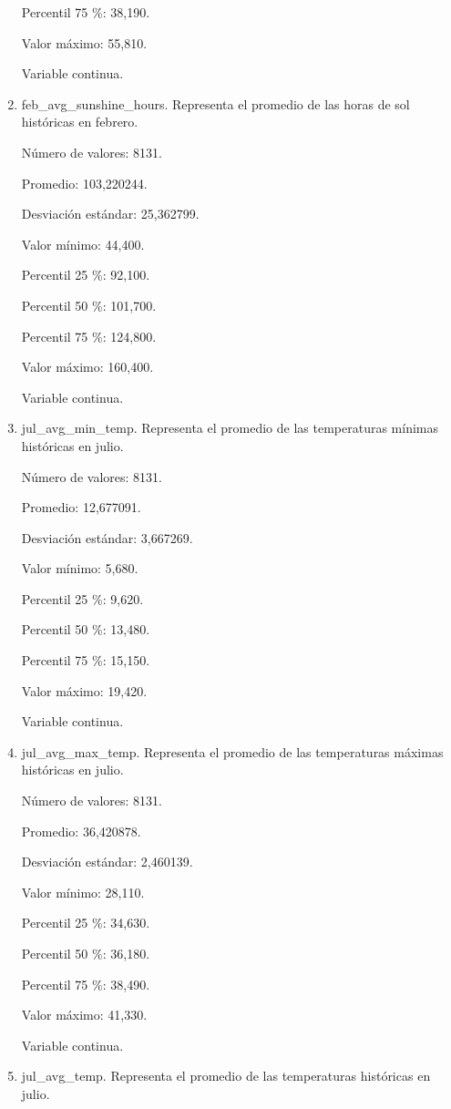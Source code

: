 \begin{enumerate}
	Percentil 75 \%: 38,190.
	
	Valor máximo: 55,810.
	
	Variable continua.

	\item feb\_avg\_sunshine\_hours. Representa el promedio de las horas de sol históricas en febrero.
	
	Número de valores: 8131.
	
	Promedio: 103,220244.
	
	Desviación estándar: 25,362799.
	
	Valor mínimo: 44,400.
	
	Percentil 25 \%: 92,100.
	
	Percentil 50 \%: 101,700.
	
	Percentil 75 \%: 124,800.
	
	Valor máximo: 160,400.
	
	Variable continua.

	\item jul\_avg\_min\_temp. Representa el promedio de las temperaturas mínimas históricas en julio.
	
	Número de valores: 8131.
	
	Promedio: 12,677091.
	
	Desviación estándar: 3,667269.
	
	Valor mínimo: 5,680.
	
	Percentil 25 \%: 9,620.
	
	Percentil 50 \%: 13,480.
	
	Percentil 75 \%: 15,150.
	
	Valor máximo: 19,420.
	
	Variable continua.

	\item jul\_avg\_max\_temp. Representa el promedio de las temperaturas máximas históricas en julio.
	
	Número de valores: 8131.
	
	Promedio: 36,420878.
	
	Desviación estándar: 2,460139.
	
	Valor mínimo: 28,110.
	
	Percentil 25 \%: 34,630.
	
	Percentil 50 \%: 36,180.
	
	Percentil 75 \%: 38,490.
	
	Valor máximo: 41,330.
	
	Variable continua.

	\item jul\_avg\_temp. Representa el promedio de las temperaturas históricas en julio.
	

\end{enumerate}
